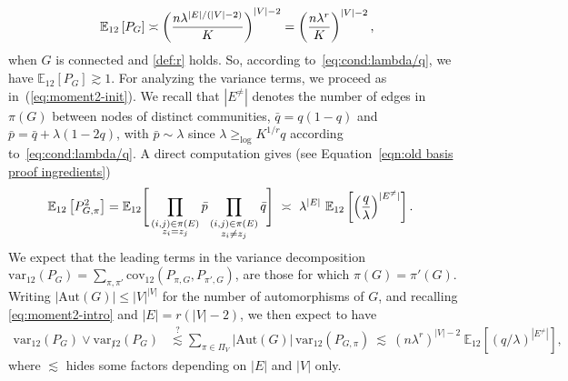 \documentclass[final]{colt2026}
\newcommand{\1}{\mathbf{1}}
\newcommand{\bbE}{\mathbb{E}}
\newcommand{\pa}[1]{\left(#1\right)}
\newcommand{\ac}[1]{\left\{#1\right\}}
\newcommand{\cro}[1]{\left[#1\right]}
\begin{document}
\begin{equation}\label{eq:E12:intro}
\bbE_{12}\cro{P_{G}} \asymp \pa{n \lambda^{|E|/(|V|-2)}\over K}^{|V|-2}=\pa{n \lambda^{r}\over K}^{|V|-2},
\end{equation}
when $G$ is connected and \eqref{def:r} holds.
So, according to~\eqref{eq:cond:lambda/q}, we have $\bbE_{12}\cro{P_{G}}\gtrsim 1$. 
For analyzing the variance terms, we proceed as in~(\ref{eq:moment2-init}).
We recall that $|E^{\neq}|$ denotes the number of edges in $\pi(G)$  between nodes of distinct communities, 
$\bar q=q(1-q)$ and $\bar p= \bar q +\lambda (1-2q)$, with $\bar p\sim \lambda$ since $\lambda \geq_{\log} K^{1/r} q$ according to~\eqref{eq:cond:lambda/q}.
A direct computation gives (see Equation~\eqref{eqn:old basis proof ingredients})
\begin{align}
\bbE_{12}\cro{P_{G,\pi}^2} & =\bbE_{12}\Bigg[\prod_{\substack{(i,j)\in \pi(E) \\ z_{i} =z_{j}}}\bar p\prod_{\substack{(i,j)\in \pi(E) \\ z_{i} \neq z_{j}}}\bar q\Bigg]
\ \asymp\ \lambda^{|E|}\ \bbE_{12}\cro{\pa{q\over \lambda}^{|E^{\neq}|}}.\label{eq:moment2-intro}
\end{align}
We expect that the leading terms in the variance decomposition 
$\displaystyle{\mathrm{var}_{12}(P_{G})=\sum_{\pi,\pi'} \mathrm{cov}_{12}(P_{\pi,G},P_{\pi',G})}$,
are those for which $\pi(G)=\pi'(G)$.
 Writing $|\mathrm{Aut}(G)|\leq |V|^{|V|}$ for the number of automorphisms of $G$, and recalling \eqref{eq:moment2-intro} and $|E|=r(|V|-2)$, we then expect to have
\begin{align}
\mathrm{var}_{12}(P_{G})\vee  \mathrm{var}_{\not 12}(P_{G})&\stackrel{?}{\lesssim} \sum_{\pi\in \Pi_{V}} |\mathrm{Aut}(G)|\,\mathrm{var}_{12}(P_{G,\pi}) 
\ \lesssim\ \pa{n\lambda^r}^{|V|-2}\ \bbE_{12}\cro{(q/\lambda)^{|E^{\neq}|}},\label{eq:basic:var}
\end{align}
where $\lesssim$  hides some factors depending on $|E|$ and $|V|$ only. 
\end{document}
